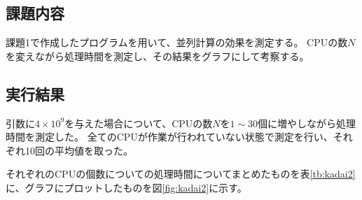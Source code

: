 \documentclass[a4j,titlepage]{jsarticle}
\begin{document}
\subsection{課題内容}
課題1で作成したプログラムを用いて、並列計算の効果を測定する。
CPUの数$N$を変えながら処理時間を測定し、その結果をグラフにして考察する。

\subsection{実行結果}
引数に$4 \times 10^9$を与えた場合について、CPUの数$N$を$1 \sim 30$個に増やしながら処理時間を測定した。
全てのCPUが作業が行われていない状態で測定を行い、それぞれ10回の平均値を取った。

それぞれのCPUの個数についての処理時間についてまとめたものを表\ref{tb:kadai2}に、グラフにプロットしたものを図\ref{fig:kadai2}に示す。
\end{document}
